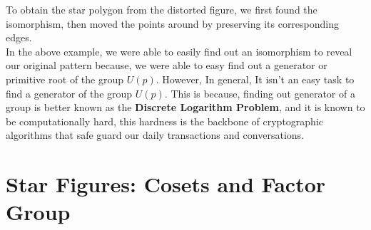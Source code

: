 \documentclass{article}
\begin{document}

To obtain the star polygon from the distorted figure, we first found the isomorphism, then moved the points around by preserving its corresponding edges.\\[2mm]
In the above example, we were able to easily find out an isomorphism to reveal our original pattern because, we were able to easy find out a generator or primitive root of the group $U(p)$. However, In general, It isn't an easy task to find a generator of the group $U(p)$. This is because, finding out generator of a group is better known as the \textbf{Discrete Logarithm Problem}, and it is known to be computationally hard, this hardness is the backbone of cryptographic algorithms that safe guard our daily transactions and conversations.

\section{Star Figures: Cosets and Factor Group}
\end{document}
